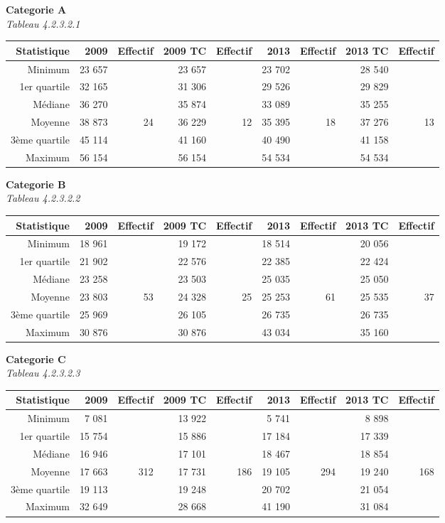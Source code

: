 \textbf{Categorie A}\\
\hspace*{0.333em}\emph{Tableau 4.2.3.2.1}

\begin{longtable}[]{@{}rrrrrrrrr@{}}
\toprule
Statistique & 2009 & Effectif & 2009 TC & Effectif & 2013 & Effectif &
2013 TC & Effectif\tabularnewline
\midrule
\endhead
Minimum & 23 657 & & 23 657 & & 23 702 & & 28 540 &\tabularnewline
1er quartile & 32 165 & & 31 306 & & 29 526 & & 29 829 &\tabularnewline
Médiane & 36 270 & & 35 874 & & 33 089 & & 35 255 &\tabularnewline
Moyenne & 38 873 & 24 & 36 229 & 12 & 35 395 & 18 & 37 276 &
13\tabularnewline
3ème quartile & 45 114 & & 41 160 & & 40 490 & & 41 158 &\tabularnewline
Maximum & 56 154 & & 56 154 & & 54 534 & & 54 534 &\tabularnewline
\bottomrule
\end{longtable}

\textbf{Categorie B}\\
\hspace*{0.333em}\emph{Tableau 4.2.3.2.2}

\begin{longtable}[]{@{}rrrrrrrrr@{}}
\toprule
Statistique & 2009 & Effectif & 2009 TC & Effectif & 2013 & Effectif &
2013 TC & Effectif\tabularnewline
\midrule
\endhead
Minimum & 18 961 & & 19 172 & & 18 514 & & 20 056 &\tabularnewline
1er quartile & 21 902 & & 22 576 & & 22 385 & & 22 424 &\tabularnewline
Médiane & 23 258 & & 23 503 & & 25 035 & & 25 050 &\tabularnewline
Moyenne & 23 803 & 53 & 24 328 & 25 & 25 253 & 61 & 25 535 &
37\tabularnewline
3ème quartile & 25 969 & & 26 105 & & 26 735 & & 26 735 &\tabularnewline
Maximum & 30 876 & & 30 876 & & 43 034 & & 35 160 &\tabularnewline
\bottomrule
\end{longtable}

\textbf{Categorie C}\\
\hspace*{0.333em}\emph{Tableau 4.2.3.2.3}

\begin{longtable}[]{@{}rrrrrrrrr@{}}
\toprule
Statistique & 2009 & Effectif & 2009 TC & Effectif & 2013 & Effectif &
2013 TC & Effectif\tabularnewline
\midrule
\endhead
Minimum & 7 081 & & 13 922 & & 5 741 & & 8 898 &\tabularnewline
1er quartile & 15 754 & & 15 886 & & 17 184 & & 17 339 &\tabularnewline
Médiane & 16 946 & & 17 101 & & 18 467 & & 18 854 &\tabularnewline
Moyenne & 17 663 & 312 & 17 731 & 186 & 19 105 & 294 & 19 240 &
168\tabularnewline
3ème quartile & 19 113 & & 19 248 & & 20 702 & & 21 054 &\tabularnewline
Maximum & 32 649 & & 28 668 & & 41 190 & & 31 084 &\tabularnewline
\bottomrule
\end{longtable}

